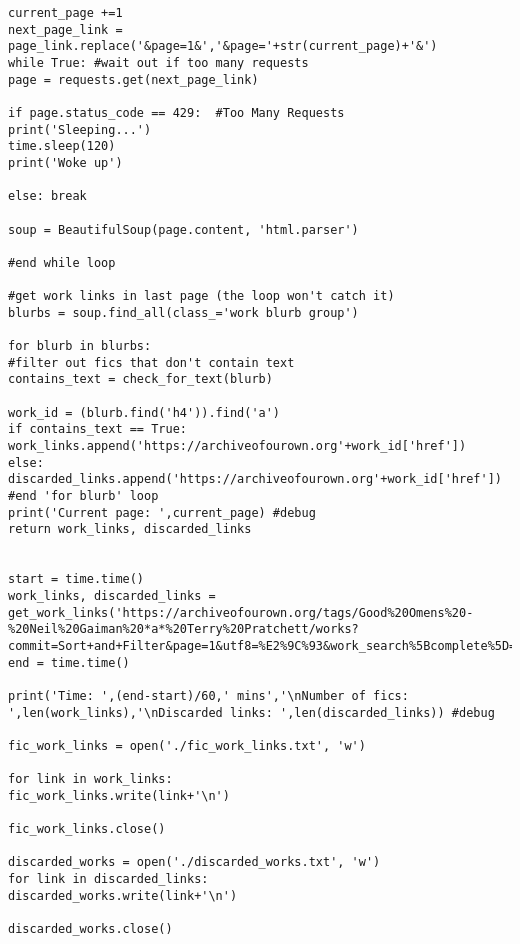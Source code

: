 \documentclass{pre-tfg}
\begin{document}
\begin{lstlisting}[style=consola]
current_page +=1
next_page_link = page_link.replace('&page=1&','&page='+str(current_page)+'&')
while True: #wait out if too many requests
page = requests.get(next_page_link)

if page.status_code == 429:  #Too Many Requests
print('Sleeping...')
time.sleep(120)
print('Woke up')

else: break

soup = BeautifulSoup(page.content, 'html.parser')

#end while loop

#get work links in last page (the loop won't catch it)
blurbs = soup.find_all(class_='work blurb group')

for blurb in blurbs:
#filter out fics that don't contain text
contains_text = check_for_text(blurb)

work_id = (blurb.find('h4')).find('a')
if contains_text == True: work_links.append('https://archiveofourown.org'+work_id['href'])
else: discarded_links.append('https://archiveofourown.org'+work_id['href'])
#end 'for blurb' loop
print('Current page: ',current_page) #debug
return work_links, discarded_links


start = time.time()
work_links, discarded_links = get_work_links('https://archiveofourown.org/tags/Good%20Omens%20-%20Neil%20Gaiman%20*a*%20Terry%20Pratchett/works?commit=Sort+and+Filter&page=1&utf8=%E2%9C%93&work_search%5Bcomplete%5D=&work_search%5Bcrossover%5D=&work_search%5Bdate_from%5D=&work_search%5Bdate_to%5D=&work_search%5Bexcluded_tag_names%5D=Fanart%2CPodfic&work_search%5Blanguage_id%5D=en&work_search%5Bother_tag_names%5D=&work_search%5Bquery%5D=&work_search%5Bsort_column%5D=revised_at&work_search%5Bwords_from%5D=&work_search%5Bwords_to%5D=')
end = time.time()

print('Time: ',(end-start)/60,' mins','\nNumber of fics: ',len(work_links),'\nDiscarded links: ',len(discarded_links)) #debug

fic_work_links = open('./fic_work_links.txt', 'w')

for link in work_links:
fic_work_links.write(link+'\n')

fic_work_links.close()

discarded_works = open('./discarded_works.txt', 'w')
for link in discarded_links:
discarded_works.write(link+'\n')

discarded_works.close()



\end{lstlisting}

\cleardoublepage
\end{document}
